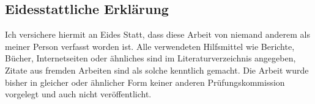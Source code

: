 \subsection*{Eidesstattliche Erklärung}

Ich versichere hiermit an Eides Statt, dass diese Arbeit von niemand anderem 
als meiner Person verfasst worden ist. Alle verwendeten Hilfsmittel wie 
Berichte, Bücher, Internetseiten oder ähnliches sind im Literaturverzeichnis 
angegeben, Zitate aus fremden Arbeiten sind als solche kenntlich gemacht. Die 
Arbeit wurde bisher in gleicher oder ähnlicher Form keiner anderen 
Prüfungskommission vorgelegt und auch nicht veröffentlicht.\\

\thesisDate \\

\studentName
